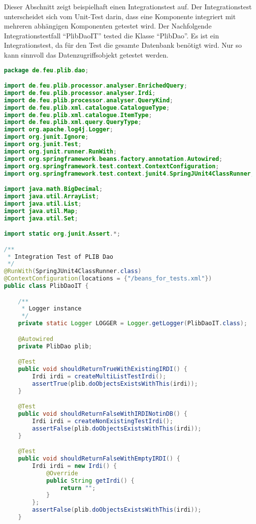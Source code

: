 Dieser Abschnitt zeigt beispielhaft einen Integrationstest auf. Der Integrationstest unterscheidet sich vom Unit-Test darin, dass eine Komponente integriert mit mehreren abhängigen Komponenten getestet wird. 
Der Nachfolgende Integrationstestfall \enquote{PlibDaoIT} tested die Klasse \enquote{PlibDao}. Es ist ein Integrationstest, da für den Test die gesamte Datenbank benötigt wird. Nur so kann sinnvoll das Datenzugriffsobjekt getestet werden. 

\begin{lstlisting}[caption=Beispiel eines Integrationstests, language=Java, label=lst:integrationstest_beispiel]
package de.feu.plib.dao;

import de.feu.plib.processor.analyser.EnrichedQuery;
import de.feu.plib.processor.analyser.Irdi;
import de.feu.plib.processor.analyser.QueryKind;
import de.feu.plib.xml.catalogue.CatalogueType;
import de.feu.plib.xml.catalogue.ItemType;
import de.feu.plib.xml.query.QueryType;
import org.apache.log4j.Logger;
import org.junit.Ignore;
import org.junit.Test;
import org.junit.runner.RunWith;
import org.springframework.beans.factory.annotation.Autowired;
import org.springframework.test.context.ContextConfiguration;
import org.springframework.test.context.junit4.SpringJUnit4ClassRunner;

import java.math.BigDecimal;
import java.util.ArrayList;
import java.util.List;
import java.util.Map;
import java.util.Set;

import static org.junit.Assert.*;

/**
 * Integration Test of PLIB Dao
 */
@RunWith(SpringJUnit4ClassRunner.class)
@ContextConfiguration(locations = {"/beans_for_tests.xml"})
public class PlibDaoIT {

    /**
     * Logger instance
     */
    private static Logger LOGGER = Logger.getLogger(PlibDaoIT.class);

    @Autowired
    private PlibDao plib;

    @Test
    public void shouldReturnTrueWithExistingIRDI() {
        Irdi irdi = createMultiListTestIrdi();
        assertTrue(plib.doObjectsExistsWithThis(irdi));
    }

    @Test
    public void shouldReturnFalseWithIRDINotinDB() {
        Irdi irdi = createNonExistingTestIrdi();
        assertFalse(plib.doObjectsExistsWithThis(irdi));
    }

    @Test
    public void shouldReturnFalseWithEmptyIRDI() {
        Irdi irdi = new Irdi() {
            @Override
            public String getIrdi() {
                return "";
            }
        };
        assertFalse(plib.doObjectsExistsWithThis(irdi));
    }


\end{lstlisting}
